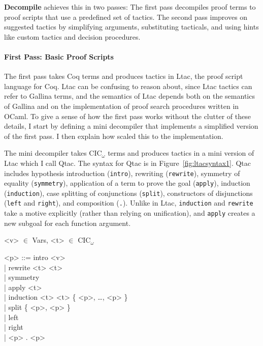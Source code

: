 \textbf{Decompile} achieves this in two passes: The first pass decompiles proof terms to proof scripts that use a predefined set of tactics.
The second pass improves on suggested tactics by simplifying arguments, substituting tacticals, and using
hints like custom tactics and decision procedures. %

\paragraph{First Pass: Basic Proof Scripts}
The first pass takes Coq terms and produces tactics in Ltac, the proof script language for Coq.
Ltac can be confusing to reason about, since Ltac tactics can refer to Gallina terms, and the semantics of Ltac depends both on the
semantics of Gallina and on the implementation of proof search procedures written in OCaml.
To give a sense of how the first pass works without the clutter of these details, I start by defining a mini decompiler that 
implements a simplified version of the first pass.
I then explain how  scaled this to the implementation.

The mini decompiler takes CIC$_{\omega}$ terms and produces tactics in a 
mini version of Ltac which I call Qtac.
The syntax for Qtac is in Figure~\ref{fig:ltacsyntax1}.
Qtac includes hypothesis introduction (\lstinline{intro}),
rewriting (\lstinline{rewrite}), symmetry of equality (\lstinline{symmetry}),
application of a term to prove the goal (\lstinline{apply}), induction (\lstinline{induction}),
case splitting of conjunctions (\lstinline{split}),
constructors of disjunctions (\lstinline{left} and \lstinline{right}), and
composition (\lstinline{.}).
Unlike in Ltac, \lstinline{induction} and \lstinline{rewrite} take a motive explicitly (rather than relying on unification),
and \lstinline{apply} creates a new subgoal for each function argument.


\begin{figure*}
\small
\begin{grammar}
<v> $\in$ Vars, <t> $\in$ CIC$_{\omega}$

<p> ::= intro <v> \\ | rewrite <t> <t> \\  |  symmetry \\  |  apply <t> \\  |  induction <t> <t> \{ <p>, \ldots, <p> \} \\  |  split \{ <p>, <p> \} \\ |  left \\  |  right \\  |  <p> . <p>
\end{grammar}
\vspace{-0.5cm}
\caption{Qtac syntax.}
\label{fig:ltacsyntax1}
\end{figure*}

